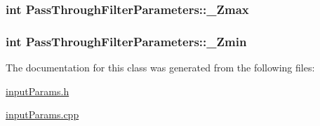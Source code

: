 \hypertarget{classPassThroughFilterParameters_a17a5cb0a726473f5a71d193a098858f0}{
\subsubsection[{\-\_\-\-Zmax}]{\setlength{\rightskip}{0pt plus 5cm}int Pass\-Through\-Filter\-Parameters\-::\-\_\-\-Zmax\hspace{0.3cm}{\ttfamily [private]}}}\label{classPassThroughFilterParameters_a17a5cb0a726473f5a71d193a098858f0}
\hypertarget{classPassThroughFilterParameters_ad11727c9de1a3cbd024ebcf657f01567}{
\subsubsection[{\-\_\-\-Zmin}]{\setlength{\rightskip}{0pt plus 5cm}int Pass\-Through\-Filter\-Parameters\-::\-\_\-\-Zmin\hspace{0.3cm}{\ttfamily [private]}}}\label{classPassThroughFilterParameters_ad11727c9de1a3cbd024ebcf657f01567}


The documentation for this class was generated from the following files\-:\begin{DoxyCompactItemize}
\item 
\hyperlink{inputParams_8h}{input\-Params.\-h}\item 
\hyperlink{inputParams_8cpp}{input\-Params.\-cpp}\end{DoxyCompactItemize}
